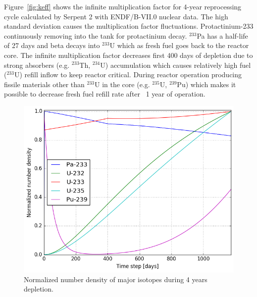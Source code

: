 \documentclass{anstrans}
\begin{document}
Figure~\ref{fig:keff} shows the infinite multiplication factor for 4-year 
reprocessing cycle calculated by Serpent 2 with ENDF/B-VII.0 nuclear data. The 
high standard deviation causes the multiplication factor fluctuations. 
Protactinium-233 continuously removing into the tank for protactinium decay. 
$^{233}$Pa has a half-life of 27 days and beta decays into $^{233}$U which as 
fresh fuel goes back to the reactor core. The infinite multiplication factor 
decreases first 400 days of depletion due to strong absorbers (e.g. $^{233}$Th, 
$^{234}$U) accumulation which causes relatively high fuel ($^{233}$U) refill 
inflow to keep reactor critical. During reactor operation producing fissile 
materials other than $^{233}$U in the core (e.g. $^{235}$U, $^{239}$Pu) which 
makes it possible to decrease fresh fuel refill rate after ~1 year of 
operation.

\begin{figure}[ht] %
        \centering
        \vspace{-0.8em}
        \includegraphics[width=1.03\linewidth]{fuel_composition.png}
        \caption{Normalized number density of major isotopes during 4 years 
        depletion.}
        \label{fig:compos}
        \vspace{-0.8em}
\end{figure}
\end{document}
